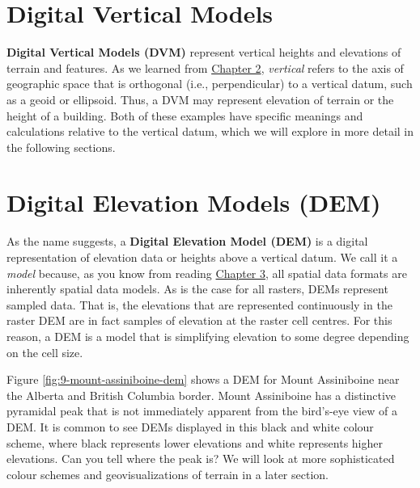 \documentclass[
]{book}
\begin{document}
\hypertarget{digital-vertical-models}{%
\section{Digital Vertical Models}\label{digital-vertical-models}}

\textbf{Digital Vertical Models (DVM)} represent vertical heights and elevations of terrain and features. As we learned from \href{https://ubc-geomatics-textbook.github.io/geomatics-textbook/mapping-data.html}{Chapter 2}, \emph{vertical} refers to the axis of geographic space that is orthogonal (i.e., perpendicular) to a vertical datum, such as a geoid or ellipsoid. Thus, a DVM may represent elevation of terrain or the height of a building. Both of these examples have specific meanings and calculations relative to the vertical datum, which we will explore in more detail in the following sections.

\hypertarget{digital-elevation-models-dem}{%
\section{Digital Elevation Models (DEM)}\label{digital-elevation-models-dem}}

As the name suggests, a \textbf{Digital Elevation Model (DEM)} is a digital representation of elevation data or heights above a vertical datum. We call it a \emph{model} because, as you know from reading \href{https://ubc-geomatics-textbook.github.io/geomatics-textbook/types-of-data.html}{Chapter 3}, all spatial data formats are inherently spatial data models. As is the case for all rasters, DEMs represent sampled data. That is, the elevations that are represented continuously in the raster DEM are in fact samples of elevation at the raster cell centres. For this reason, a DEM is a model that is simplifying elevation to some degree depending on the cell size.

Figure \ref{fig:9-mount-assiniboine-dem} shows a DEM for Mount Assiniboine near the Alberta and British Columbia border. Mount Assiniboine has a distinctive pyramidal peak that is not immediately apparent from the bird's-eye view of a DEM. It is common to see DEMs displayed in this black and white colour scheme, where black represents lower elevations and white represents higher elevations. Can you tell where the peak is? We will look at more sophisticated colour schemes and geovisualizations of terrain in a later section.
\end{document}
